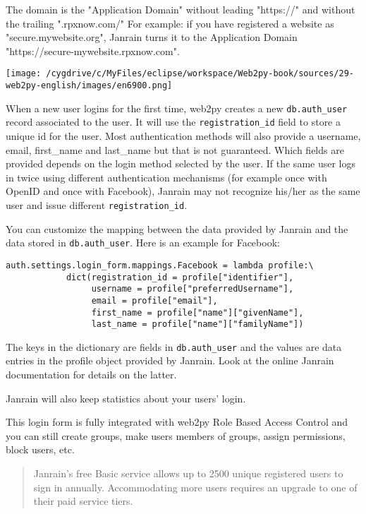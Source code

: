 \documentclass[justified,sixbynine,notoc]{tufte-book}
\def\ft{\small\tt}
\begin{document}
\begin{fullwidth}
The domain is the "Application Domain" without leading "https://" and without the trailing ".rpxnow.com/"
For example: if you have registered a website as "secure.mywebsite.org", Janrain turns it to the Application Domain "https://secure-mywebsite.rpxnow.com".


\goodbreak\begin{center}\texttt{[image: /cygdrive/c/MyFiles/eclipse/workspace/Web2py-book/sources/29-web2py-english/images/en6900.png]}\end{center}


When a new user logins for the first time, web2py creates a new {\ft db.auth\_user} record associated to the user. It will use the {\ft registration\_id} field to store a unique id for the user. Most authentication methods will also provide a username, email, first\_name and last\_name but that is not guaranteed. Which fields are provided depends on the login method selected by the user. If the same user logs in twice using different authentication mechanisms (for example once with OpenID and once with Facebook), Janrain may not recognize his/her as the same user and issue different {\ft registration\_id}.

You can customize the mapping between the data provided by Janrain and the data stored in {\ft db.auth\_user}. Here is an example for Facebook:
\begin{lstlisting}
auth.settings.login_form.mappings.Facebook = lambda profile:\
            dict(registration_id = profile["identifier"],
                 username = profile["preferredUsername"],
                 email = profile["email"],
                 first_name = profile["name"]["givenName"],
                 last_name = profile["name"]["familyName"])
\end{lstlisting}

The keys in the dictionary are fields in {\ft db.auth\_user} and the values are data entries in the profile object provided by Janrain. Look at the online Janrain documentation for details on the latter.

Janrain will also keep statistics about your users' login.

This login form is fully integrated with web2py Role Based Access Control and you can still create groups, make users members of groups, assign permissions, block users, etc.

\begin{quote}Janrain's free Basic service allows up to 2500 unique registered users to sign in annually. Accommodating more users requires an upgrade to one of their paid service tiers.


\end{quote}
\end{fullwidth}
\end{document}
